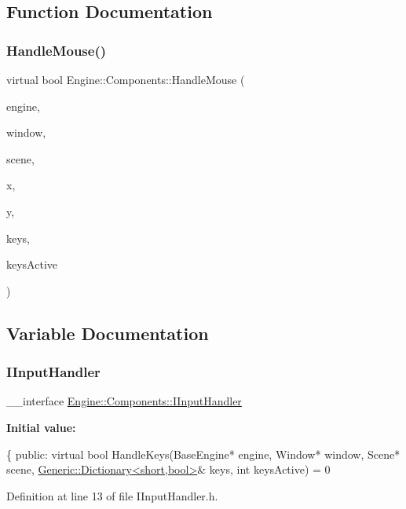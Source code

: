\subsection{Function Documentation}
\mbox{\label{namespaceEngine_1_1Components_a9a8cd7405775f5dee0a0944c4019cc93}} 
\subsubsection{\texorpdfstring{Handle\+Mouse()}{HandleMouse()}}
{\footnotesize\ttfamily virtual bool Engine\+::\+Components\+::\+Handle\+Mouse (\begin{DoxyParamCaption}\item[{\mbox{\hyperlink{classEngine_1_1BaseEngine}{Base\+Engine}} $\ast$}]{engine,  }\item[{\mbox{\hyperlink{classEngine_1_1Components_1_1Window}{Window}} $\ast$}]{window,  }\item[{\mbox{\hyperlink{classEngine_1_1Components_1_1Scene}{Scene}} $\ast$}]{scene,  }\item[{double}]{x,  }\item[{double}]{y,  }\item[{\mbox{\hyperlink{classGeneric_1_1Dictionary}{Generic\+::\+Dictionary}}$<$ short, bool $>$ \&}]{keys,  }\item[{int}]{keys\+Active }\end{DoxyParamCaption})\hspace{0.3cm}{\ttfamily [pure virtual]}}



\subsection{Variable Documentation}
\mbox{\label{namespaceEngine_1_1Components_ac8d3da616707b57e065fd62e6701415f}} 
\subsubsection{\texorpdfstring{I\+Input\+Handler}{IInputHandler}}
{\footnotesize\ttfamily \+\_\+\+\_\+interface \mbox{\hyperlink{classEngine_1_1Components_1_1IInputHandler}{Engine\+::\+Components\+::\+I\+Input\+Handler}}}

{\bfseries Initial value\+:}
\begin{DoxyCode}
\{
        \textcolor{keyword}{public}:
            \textcolor{keyword}{virtual} \textcolor{keywordtype}{bool} HandleKeys(BaseEngine* engine, Window* window, Scene* scene, 
      \mbox{\hyperlink{classGeneric_1_1Dictionary}{Generic::Dictionary<short,bool>}}& keys, \textcolor{keywordtype}{int} keysActive) = 0
\end{DoxyCode}


Definition at line 13 of file I\+Input\+Handler.\+h.

